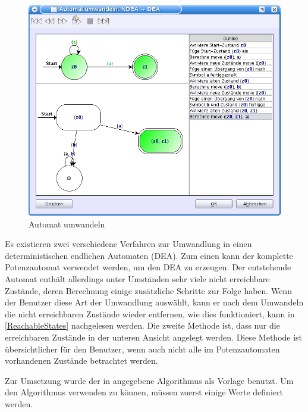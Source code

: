 \begin{figure}[h!]
\begin{center}
\includegraphics[width=12cm]{../images/convert_to.png}
\caption{Automat umwandeln}
\end{center}
\end{figure}
\vspace{10pt}

Es existieren zwei verschiedene Verfahren zur Umwandlung in einen
deterministischen endlichen Automaten (DEA). Zum einen kann der komplette
Potenzautomat verwendet werden, um den DEA zu erzeugen. Der entstehende Automat
enthält allerdings unter Umständen sehr viele nicht erreichbare Zustände, deren
Berechnung einige zusätzliche Schritte zur Folge haben. Wenn der Benutzer diese
Art der Umwandlung auswählt, kann er nach dem Umwandeln die nicht erreichbaren
Zustände wieder entfernen, wie dies funktioniert, kann in \ref{ReachableStates}
nachgelesen werden. Die zweite Methode ist, dass nur die erreichbaren Zustände
in der unteren Ansicht angelegt werden. Diese Methode ist übersichtlicher für
den Benutzer, wenn auch nicht alle im Potenzautomaten vorhandenen Zustände
betrachtet werden.\vspace{10pt}

Zur Umsetzung wurde der in \cite[S. 153ff]{Compilers} angegebene Algorithmus als
Vorlage benutzt. Um den Algorithmus verwenden zu können, müssen zuerst einige
Werte definiert werden.\vspace{10pt}

